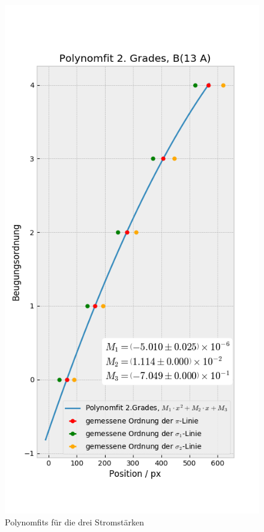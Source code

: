 \begin{myframe}{}
\begin{figure}
              \includegraphics[height=.85\paperheight]{img/sco_13A}
              \caption{Polynomfits für die drei Stromstärken} 
          \end{figure}
      \end{myframe}

